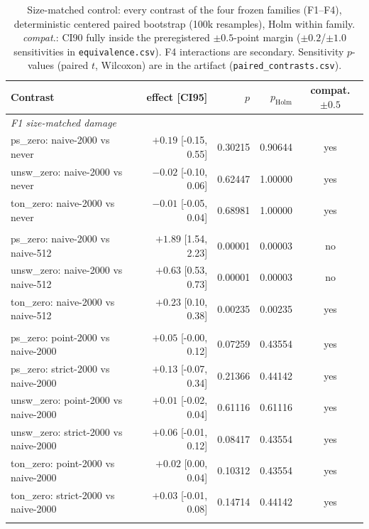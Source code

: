\begin{table}
\centering
\caption{Size-matched control: every contrast of the four frozen families (F1--F4),
deterministic centered paired bootstrap (100k resamples), Holm within family.
\emph{compat.}: CI90 fully inside the preregistered $\pm0.5$-point margin
($\pm0.2$/$\pm1.0$ sensitivities in \texttt{equivalence.csv}). F4 interactions are
secondary. Sensitivity $p$-values (paired $t$, Wilcoxon) are in the artifact
(\texttt{paired\_contrasts.csv}).}
\label{tab:size_matched_supp_contrasts}
\scriptsize
\begin{tabular}{l r r r c}
\toprule
Contrast & effect [CI95] & $p$ & $p_{\mathrm{Holm}}$ & compat. $\pm0.5$ \\
\midrule
\multicolumn{5}{l}{\emph{F1 size-matched damage}} \\
ps\_zero: naive-2000 vs never & $+0.19$ [-0.15, 0.55] & 0.30215 & 0.90644 & yes \\
unsw\_zero: naive-2000 vs never & $-0.02$ [-0.10, 0.06] & 0.62447 & 1.00000 & yes \\
ton\_zero: naive-2000 vs never & $-0.01$ [-0.05, 0.04] & 0.68981 & 1.00000 & yes \\
\addlinespace
\multicolumn{5}{l}{\emph{F2 candidate-size effect}} \\
ps\_zero: naive-2000 vs naive-512 & $+1.89$ [1.54, 2.23] & 0.00001 & 0.00003 & no \\
unsw\_zero: naive-2000 vs naive-512 & $+0.63$ [0.53, 0.73] & 0.00001 & 0.00003 & no \\
ton\_zero: naive-2000 vs naive-512 & $+0.23$ [0.10, 0.38] & 0.00235 & 0.00235 & yes \\
\addlinespace
\multicolumn{5}{l}{\emph{F3 gate value at size 2000}} \\
ps\_zero: point-2000 vs naive-2000 & $+0.05$ [-0.00, 0.12] & 0.07259 & 0.43554 & yes \\
ps\_zero: strict-2000 vs naive-2000 & $+0.13$ [-0.07, 0.34] & 0.21366 & 0.44142 & yes \\
unsw\_zero: point-2000 vs naive-2000 & $+0.01$ [-0.02, 0.04] & 0.61116 & 0.61116 & yes \\
unsw\_zero: strict-2000 vs naive-2000 & $+0.06$ [-0.01, 0.12] & 0.08417 & 0.43554 & yes \\
ton\_zero: point-2000 vs naive-2000 & $+0.02$ [0.00, 0.04] & 0.10312 & 0.43554 & yes \\
ton\_zero: strict-2000 vs naive-2000 & $+0.03$ [-0.01, 0.08] & 0.14714 & 0.44142 & yes \\
\addlinespace

\end{tabular}
\end{table}
